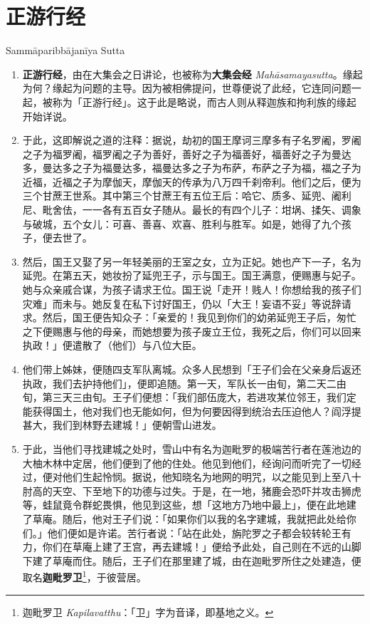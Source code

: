 \section{正游行经}

\begin{center}Sammāparibbājanīya Sutta\end{center}\vspace{1em}

\begin{enumerate}\item \textbf{正游行经}，由在大集会之日讲论，也被称为\textbf{大集会经} \textit{Mahāsamayasutta}。缘起为何？缘起为问题的主导。因为被相佛提问，世尊便说了此经，它连同问题一起，被称为「正游行经」。这于此是略说，而古人则从释迦族和拘利族的缘起开始详说。
\item 于此，这即解说之道的注释：据说，劫初的国王摩诃三摩多有子名罗阇，罗阇之子为福罗阇，福罗阇之子为善好，善好之子为福善好，福善好之子为曼达多，曼达多之子为福曼达多，福曼达多之子为布萨，布萨之子为福，福之子为近福，近福之子为摩伽天，摩伽天的传承为八万四千刹帝利。他们之后，便为三个甘蔗王世系。其中第三个甘蔗王有五位王后：哈它、质多、延兜、阇利尼、毗舍佉，一一各有五百女子随从。最长的有四个儿子：坩埚、揉矢、调象与破城，五个女儿：可喜、善喜、欢喜、胜利与胜军。如是，她得了九个孩子，便去世了。
\item 然后，国王又娶了另一年轻美丽的王室之女，立为正妃。她也产下一子，名为延兜。在第五天，她妆扮了延兜王子，示与国王。国王满意，便赐惠与妃子。她与众亲戚合谋，为孩子请求王位。国王说「走开！贱人！你想给我的孩子们灾难」而未与。她反复在私下讨好国王，仍以「大王！妄语不妥」等说辞请求。然后，国王便告知众子：「亲爱的！我见到你们的幼弟延兜王子后，匆忙之下便赐惠与他的母亲，而她想要为孩子废立王位，我死之后，你们可以回来执政！」便遣散了（他们）与八位大臣。
\item 他们带上姊妹，便随四支军队离城。众多人民想到「王子们会在父亲身后返还执政，我们去护持他们」，便即追随。第一天，军队长一由旬，第二天二由旬，第三天三由旬。王子们便想：「我们部伍庞大，若进攻某位邻王，我们定能获得国土，他对我们也无能如何，但为何要因得到统治去压迫他人？阎浮提甚大，我们到林野去建城！」便朝雪山进发。
\item 于此，当他们寻找建城之处时，雪山中有名为迦毗罗的极端苦行者在莲池边的大柚木林中定居，他们便到了他的住处。他见到他们，经询问而听完了一切经过，便对他们生起怜悯。据说，他知晓名为地网的明咒，以之能见到上至八十肘高的天空、下至地下的功德与过失。于是，在一地，猪鹿会恐吓并攻击狮虎等，蛙鼠竟令群蛇畏惧，他见到这些，想「这地方乃地中最上」，便在此地建了草庵。随后，他对王子们说：「如果你们以我的名字建城，我就把此处给你们。」他们便如是许诺。苦行者说：「站在此处，旃陀罗之子都会较转轮王有力，你们在草庵上建了王宫，再去建城！」便给予此处，自己则在不远的山脚下建了草庵而住。随后，王子们在那里建了城，由在迦毗罗所住之处建造，便取名\textbf{迦毗罗卫}\footnote{迦毗罗卫 \textit{Kapilavatthu}：「卫」字为音译，即基地之义。}，于彼营居。

\end{enumerate}

